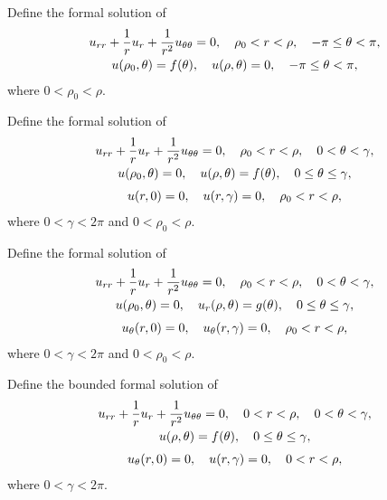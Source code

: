 \exercises
\begin{exerciselist}
  \item\label{exer:12.4.1} Define the formal solution of
  \[
    \begin{array}{c}
      \displaystyle u_{rr}+\frac{1}{r}u_{r}+\frac{1}{r^{2}}u_{\theta\theta}=0,\quad \rho_{0}<r<\rho,\quad-\pi\le\theta<\pi, \\[2\jot]
      u(\rho_{0},\theta)=f(\theta),\quad u(\rho,\theta)=0,\quad -\pi\le\theta<\pi,
    \end{array}
  \]
  where $0<\rho_{0}<\rho$.

  \item\label{exer:12.4.2} Define the formal solution of
  \[
    \begin{array}{c}
      \displaystyle u_{rr}+\frac{1}{r}u_{r}+\frac{1}{r^{2}}u_{\theta\theta}=0,\quad \rho_{0}<r<\rho,\quad0<\theta<\gamma, \\[2\jot]
      u(\rho_{0},\theta)=0,\quad u(\rho,\theta)=f(\theta),\quad 0\le\theta\le\gamma,                             \\[2\jot]
      u(r,0)=0,\quad u(r,\gamma)=0,\quad\rho_{0}<r<\rho,
    \end{array}
  \]
  where $0<\gamma<2\pi$ and $0<\rho_{0}<\rho$.

  \item\label{exer:12.4.3} Define the formal solution of
  \[
    \begin{array}{c}
      \displaystyle u_{rr}+\frac{1}{r}u_{r}+\frac{1}{r^{2}}u_{\theta\theta}=0,\quad \rho_{0}<r<\rho,\quad0<\theta<\gamma, \\[2\jot]
      u(\rho_{0},\theta)=0,\quad u_{r}(\rho,\theta)=g(\theta),\quad 0\le\theta\le\gamma,                         \\[2\jot]
      u_{\theta}(r,0)=0,\quad u_{\theta}(r,\gamma)=0,\quad\rho_{0}<r<\rho,
    \end{array}
  \]
  where $0<\gamma<2\pi$ and $0<\rho_{0}<\rho$.

  \item\label{exer:12.4.4} Define the bounded formal solution of
  \[
    \begin{array}{c}
      \displaystyle u_{rr}+\frac{1}{r}u_{r}+\frac{1}{r^{2}}u_{\theta\theta}=0,\quad 0<r<\rho,\quad0<\theta<\gamma, \\[2\jot]
      u(\rho,\theta)=f(\theta),\quad 0\le\theta\le\gamma,                                                 \\[2\jot]
      u_{\theta}(r,0)=0,\quad u(r,\gamma)=0,\quad0<r<\rho,
    \end{array}
  \]
  where $0<\gamma<2\pi$.


\end{exerciselist}

